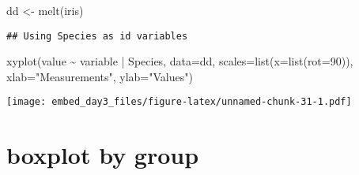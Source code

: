 \documentclass[
]{article}
\newenvironment{Shaded}{\begin{snugshade}}{\end{snugshade}}
\newcommand{\AttributeTok}[1]{\textcolor[rgb]{0.77,0.63,0.00}{#1}}
\newcommand{\DecValTok}[1]{\textcolor[rgb]{0.00,0.00,0.81}{#1}}
\newcommand{\FunctionTok}[1]{\textcolor[rgb]{0.00,0.00,0.00}{#1}}
\newcommand{\NormalTok}[1]{#1}
\newcommand{\OtherTok}[1]{\textcolor[rgb]{0.56,0.35,0.01}{#1}}
\newcommand{\SpecialCharTok}[1]{\textcolor[rgb]{0.00,0.00,0.00}{#1}}
\newcommand{\StringTok}[1]{\textcolor[rgb]{0.31,0.60,0.02}{#1}}
\begin{document}
\begin{Shaded}
\begin{Highlighting}[]
\NormalTok{dd }\OtherTok{\textless{}{-}} \FunctionTok{melt}\NormalTok{(iris)}
\end{Highlighting}
\end{Shaded}

\begin{verbatim}
## Using Species as id variables
\end{verbatim}

\begin{Shaded}
\begin{Highlighting}[]
\FunctionTok{xyplot}\NormalTok{(value }\SpecialCharTok{\textasciitilde{}}\NormalTok{ variable }\SpecialCharTok{|}\NormalTok{ Species, }\AttributeTok{data=}\NormalTok{dd, }\AttributeTok{scales=}\FunctionTok{list}\NormalTok{(}\AttributeTok{x=}\FunctionTok{list}\NormalTok{(}\AttributeTok{rot=}\DecValTok{90}\NormalTok{)), }\AttributeTok{xlab=}\StringTok{"Measurements"}\NormalTok{, }\AttributeTok{ylab=}\StringTok{"Values"}\NormalTok{)}
\end{Highlighting}
\end{Shaded}

\texttt{[image: embed\_day3\_files/figure-latex/unnamed-chunk-31-1.pdf]}

\hypertarget{boxplot-by-group}{%
\section{boxplot by group}\label{boxplot-by-group}}
\end{document}
